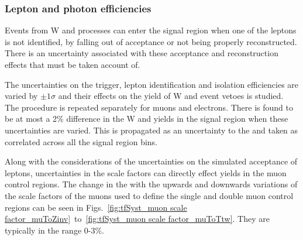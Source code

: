 \subsubsection*{Lepton and photon efficiencies}
\label{sec:tfSyst_lepton}

Events from W and \ttbar processes can enter the signal region
when one of the leptons is not identified, by falling out of
acceptance or not being properly reconstructed. There is an uncertainty
associated with these acceptance and reconstruction effects that must
be taken account of.

The uncertainties on the trigger, lepton identification and isolation
efficiencies are varied by $\pm1\sigma$ and their effects on the yield
of W and \ttbar event vetoes is studied.  The procedure is repeated
separately for muons and electrons. There is found to be at most a 2\%
difference in the W and \ttbar yields in the signal region when these
uncertainties are varied. This is propagated as an uncertainty to the
\TFs and taken as correlated across all the signal region bins. 

Along with the considerations of the uncertainties on the simulated
acceptance of leptons, uncertainties in the scale factors can directly
effect yields in the muon control regions. The change in the \TFs with
the upwards and downwards variations of the scale factors of the muons
used to define the single and double muon control regions can be seen
in Figs.~\ref{fig:tfSyst_muon scale
factor_muToZinv}~to~\ref{fig:tfSyst_muon scale factor_muToTtw}. They
are typically in the range 0-3\%.


